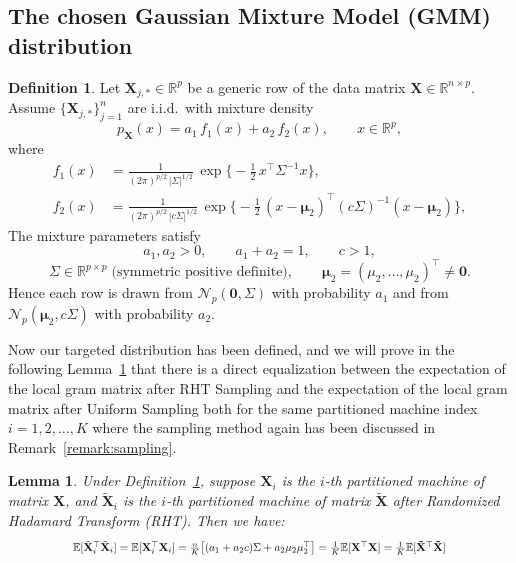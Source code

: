 \documentclass[11pt]{article}
\numberwithin{equation}{section}
\theoremstyle{plain}
\newtheorem{lemma}[theorem]{Lemma}
\theoremstyle{definition}
\newtheorem{definition}[theorem]{Definition}
\theoremstyle{remark}
\begin{document}
\subsection{The chosen Gaussian Mixture Model (GMM) distribution}
\begin{definition}
  \label{def:gmm}
  Let $\mathbf{X}_{j,\ast}\in\mathbb R^{p}$ be a generic row of the data matrix $\mathbf X\in\mathbb R^{n\times p}$.
  Assume $\{\mathbf{X}_{j,\ast}\}_{j=1}^{n}$ are i.i.d.\ with mixture density
  \[
  p_{\mathbf{X}}(x)=a_{1}\,f_{1}(x)+a_{2}\,f_{2}(x), \qquad x\in\mathbb R^{p},
  \]
  where
  \begingroup\small
  \[
  \begin{aligned}
  f_{1}(x) &=
    \frac{1}{(2\pi)^{p/2}\,|\Sigma|^{1/2}}\,
    \exp\!\bigl\{-\tfrac12\,x^{\top}\Sigma^{-1}x\bigr\},\\[4pt]
  f_{2}(x) &=
    \frac{1}{(2\pi)^{p/2}\,|c\Sigma|^{1/2}}\,
    \exp\!\bigl\{-\tfrac12\,(x-\boldsymbol\mu_{2})^{\!\top}(c\Sigma)^{-1}(x-\boldsymbol\mu_{2})\bigr\},
  \end{aligned}
  \]
  \endgroup
  \smallskip
  \noindent
  The mixture parameters satisfy
  \begingroup\small
  \[
  a_{1},a_{2}>0,\qquad a_{1}+a_{2}=1,\qquad c>1,
  \]
  \[
  \Sigma\in\mathbb R^{p\times p}\;\text{(symmetric positive definite)},\qquad
  \boldsymbol\mu_{2}=(\mu_{2},\ldots,\mu_{2})^{\!\top}\neq\boldsymbol 0.
  \]
  \endgroup
  Hence each row is drawn from $\mathcal N_{p}(\boldsymbol 0,\Sigma)$ with probability $a_{1}$ and from
  $\mathcal N_{p}(\boldsymbol\mu_{2},c\Sigma)$ with probability $a_{2}$.
  \end{definition}

Now our targeted distribution has been defined, and we will prove in the following Lemma~\ref{lemma:expectation} that there is a direct equalization between the expectation of the local gram matrix after RHT Sampling and
the expectation of the local gram matrix after Uniform Sampling both for the same partitioned machine index $i = 1,2,\ldots,K$
where the sampling method again has been discussed in Remark~\ref{remark:sampling}.

\begin{lemma}
\label{lemma:expectation}
Under Definition~\ref{def:gmm}, suppose $\mathbf{X}_{i}$ is the $i$-th partitioned machine of matrix $\mathbf{X}$, and $\mathbf{\tilde{X}}_{i}$ is the $i$-th partitioned machine of matrix $\mathbf{\tilde{X}}$ after Randomized Hadamard Transform (RHT).
Then we have:
\begin{equation*}
  \scalebox{0.79}{$
  \mathbb{E}[\tilde{\mathbf{X}}_i^{\top}\tilde{\mathbf{X}}_i]
    =\mathbb{E}[{\mathbf{X}}_i^{\top}{\mathbf{X}}_i]
    =\frac{n}{K}\bigl[(a_{1}+a_{2}c)\Sigma+a_{2}\mu_{2}\mu_{2}^{\top}\bigr]
    = \frac{1}{K} \mathbb{E}[\mathbf{X}^{\top} \mathbf{X}]
    = \frac{1}{K} \mathbb{E}[\mathbf{\tilde{X}}^{\top} \mathbf{\tilde{X}}]
  $}
\end{equation*}
\end{lemma}
\end{document}
